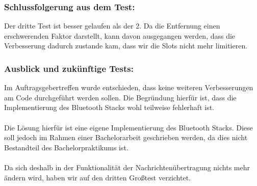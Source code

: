 \subsubsection{Schlussfolgerung aus dem
Test:}\label{schlussfolgerung-aus-dem-test-4}

Der dritte Test ist besser gelaufen als der 2. Da die Entfernung einen
erschwerenden Faktor darstellt, kann davon ausgegangen werden, dass die
Verbesserung dadurch zustande kam, dass wir die Slots nicht mehr
limitieren.

\subsubsection{Ausblick und zukünftige
Tests:}\label{ausblick-und-zukuxfcnftige-tests}

Im Auftragsgebertreffen wurde entschieden, dass keine weiteren
Verbesserungen am Code durchgeführt werden sollen. Die Begründung
hierfür ist, dass die Implementierung des Bluetooth Stacks wohl
teilweise fehlerhaft ist.
\\\\
Die Lösung hierfür ist eine eigene Implementierung des Bluetooth Stacks.
Diese soll jedoch im Rahmen einer Bachelorarbeit geschrieben werden, da
dies nicht Bestandteil des Bachelorpraktikums ist.
\\\\
Da sich deshalb in der Funktionalität der Nachrichtenübertragung nichts
mehr ändern wird, haben wir auf den dritten Großtest verzichtet.
